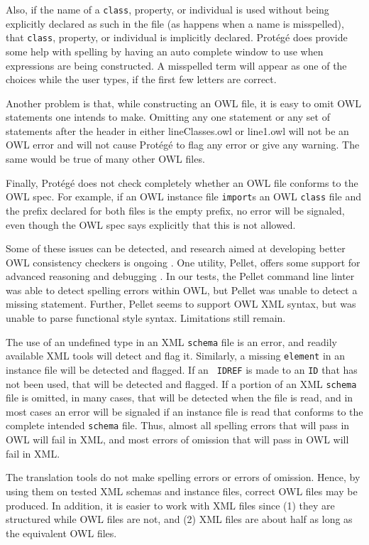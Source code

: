 \documentclass[preprint,12pt]{elsarticle}
\begin{document}
Also, if the name of a {\tt class}, property, or individual is used without
being explicitly declared as such in the file (as happens when a name is
misspelled), that {\tt class}, property, or individual is implicitly
declared. Prot\'eg\'e does provide some help with spelling by having an
auto complete window to use when expressions are being constructed. A
misspelled term will appear as one of the choices while the user types, if
the first few letters are correct.

Another problem is that, while constructing an OWL file, it is easy to omit
OWL statements one intends to make. Omitting any one statement or any set
of statements after the header in either lineClasses.owl or line1.owl will
not be an OWL error and will not cause Prot\'eg\'e to flag any error or
give any warning. The same would be true of many other OWL files.

Finally, Prot\'eg\'e does not check completely whether an OWL file conforms
to the OWL spec. For example, if an OWL instance file {\tt import}s an OWL
{\tt class} file and the prefix declared for both files is the empty
prefix, no error will be signaled, even though the OWL spec says explicitly
that this is not allowed.

Some of these issues can be detected, and research aimed at developing
better OWL consistency checkers is ongoing
\cite{owlIntegrity,moreOwlIntegrity}. One utility, Pellet, offers some
support for advanced reasoning and debugging \cite{pellet}. In our tests,
the Pellet command line linter was able to detect spelling errors within
OWL, but Pellet was unable to detect a missing statement. Further, Pellet
seems to support OWL XML syntax, but was unable to parse functional style
syntax. Limitations still remain.

The use of an undefined type in an XML {\tt schema} file is an error, and
readily available XML tools will detect and flag it. Similarly, a missing
{\tt element} in an instance file will be detected and flagged. If an {\tt
  IDREF} is made to an {\tt ID} that has not been used, that will be
detected and flagged. If a portion of an XML {\tt schema} file is omitted,
in many cases, that will be detected when the file is read, and in most
cases an error will be signaled if an instance file is read that conforms
to the complete intended {\tt schema} file. Thus, almost all spelling
errors that will pass in OWL will fail in XML, and most errors of omission
that will pass in OWL will fail in XML.

The translation tools do not make spelling errors or errors of omission.
Hence, by using them on tested XML schemas and instance files, correct OWL
files may be produced. In addition, it is easier to work with XML files
since (1) they are structured while OWL files are not, and (2) XML files
are about half as long as the equivalent OWL files.
\end{document}
